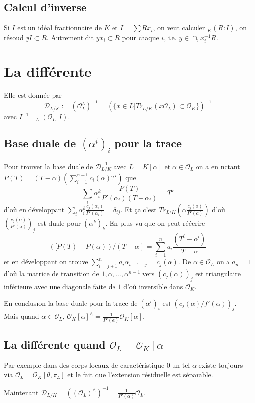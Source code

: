 \documentclass[a4paper,12pt]{book}
\newcommand{\Or}{\mathcal{O}}
\newcommand{\D}{\mathscr{D}}
\theoremstyle{plain}
\theoremstyle{definition}
\theoremstyle{remark}
\begin{document}
\subsection{Calcul d'inverse}
Si $I$ est un idéal fractionnaire de $K$ et $I=\sum Rx_i$, on veut calculer
$_K(R:I)$, on résoud $yI\subset R$. Autrement dit $yx_i\subset R$ pour
chaque $i$, i.e. $y\in \cap_i x_i^{-1}R$.

\section{La différente}
Elle est donnée par 
\[\D_{L/K}:=(\Or_L^\wedge)^{-1}=(\{x\in L| Tr_{L/K}(x\Or_L)\subset \Or_K\})^{-1}\]
avec $I^{-1}=_L(\Or_L:I)$.

\subsection{Base duale de $(\alpha^i)_i$ pour la trace}
Pour trouver la base duale de $\D_{L/K}^{-1}$
avec $L=K[\alpha]$ et $\alpha\in \Or_L$ on a en notant 
$P(T)=(T-\alpha)(\sum_{i=1}^{n-1} c_i(\alpha)T^i)$ que 
\[\sum_i \alpha_i^k\frac{P(T)}{P'(\alpha_i)(T-\alpha_i)}=T^k\]
d'où en développant 
$\sum_i \alpha_i^k\frac{c_j(\alpha_i)}{P'(\alpha_i)}=\delta_{ij}$.
Et ça c'est $Tr_{L/K}(\alpha\frac{c_j(\alpha)}{P'(\alpha)})$ d'où
$(\frac{c_j(\alpha)}{P'(\alpha)})_j$ est duale pour $(\alpha^k)_k$.
En plus vu que on peut réécrire 
\[([P(T)-P(\alpha))/(T-\alpha)=\sum_{i=1}^n a_i\frac{(T^i-\alpha^i)}{T-\alpha}\]
et en développant on trouve $\sum_{i=j+1}^n a_i\alpha_{i-1-j}=c_j(\alpha)$.
De $\alpha\in\Or_L$ on a $a_n=1$ d'où la matrice de transition de 
$1,\alpha,\ldots,\alpha^{n-1}$ vers $(c_j(\alpha))_j$ est triangulaire
inférieure avec une diagonale faite de $1$ d'où inversible dans 
$\Or_K$.

En conclusion la base duale
pour la trace de $(\alpha^i)_i$ est $(c_j(\alpha)/f'(\alpha))_j$.
Mais quand $\alpha\in\Or_L$, 
$\Or_K[\alpha]^\wedge=\frac{1}{P'(\alpha)}\Or_K[\alpha]$.
\subsection{La différente quand $\Or_L=\Or_K[\alpha]$}
Par exemple dans des corps locaux de caractéristique $0$ un tel
$\alpha$ existe toujours via $\Or_L=\Or_K[\theta,\pi_L]$ et
le fait que l'extension résiduelle est séparable.

Maintenant $\D_{L/K}=((\Or_L)^\wedge)^{-1}=\frac{1}{P'(\alpha)}\Or_L$.
\end{document}
